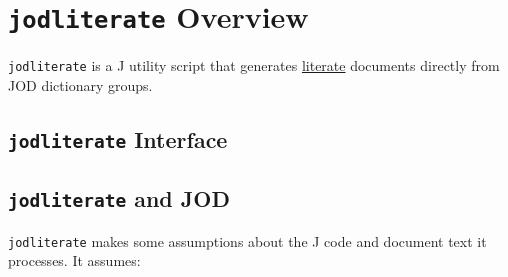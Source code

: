\section{\texttt{jodliterate} Overview}


\texttt{jodliterate} is a J utility script that generates
\href{https://en.wikipedia.org/wiki/Literate_programming}{literate} documents directly from JOD dictionary groups.

\subsection{\texttt{jodliterate} Interface}

\begin{Shaded}
\begin{Highlighting}[]
\hyperlink{THISPANDOC}
\hyperlink{grplit}
\hyperlink{ifacesection}
\hyperlink{setjodliterate}
\end{Highlighting}
\end{Shaded}

\subsection{\texttt{jodliterate} and JOD}

\texttt{jodliterate} makes some assumptions about the J code and
document text it processes. It assumes:

